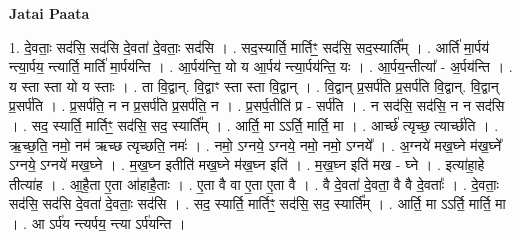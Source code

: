 \documentclass[17pt]{extarticle}
\begin{document}
\textbf{Jatai Paata} \newline

1. दे॒वताः॒ सद॑सि॒ सद॑सि दे॒वता॑ दे॒वताः॒ सद॑सि । . सद॒स्यार्ति॒ मार्तिꣳ॒॒ सद॑सि॒ सद॒स्यार्ति᳚म् । . आर्ति॑ मा॒र्पय॑ न्त्या॒र्पय॒ न्त्यार्ति॒ मार्ति॑ मा॒र्पय॑न्ति । . आ॒र्पय॑न्ति॒ यो य आ॒र्पय॑ न्त्या॒र्पय॑न्ति॒ यः । . आ॒र्पय॒न्तीत्या᳚ - अ॒र्पय॑न्ति । . य स्ता स्ता यो य स्ताः । . ता वि॒द्वान्. वि॒द्वाꣳ स्ता स्ता वि॒द्वान् । . वि॒द्वान् प्र॒सर्प॑ति प्र॒सर्प॑ति वि॒द्वान्. वि॒द्वान् प्र॒सर्प॑ति । . प्र॒सर्प॑ति॒ न न प्र॒सर्प॑ति प्र॒सर्प॑ति॒ न । . प्र॒सर्प॒तीति॑ प्र - सर्प॑ति । . न सद॑सि॒ सद॑सि॒ न न सद॑सि । . सद॒ स्यार्ति॒ मार्तिꣳ॒॒ सद॑सि॒ सद॒ स्यार्ति᳚म् । . आर्ति॒ मा ऽऽर्ति॒ मार्ति॒ मा । . आर्च्छ॑ त्यृच्छ॒ त्यार्च्छ॑ति । . ऋ॒च्छ॒ति॒ नमो॒ नम॑ ऋच्छ त्यृच्छति॒ नमः॑ । . नमो॒ ऽग्नये॒ ऽग्नये॒ नमो॒ नमो॒ ऽग्नये᳚ । . अ॒ग्नये॑ मख॒घ्ने म॑ख॒घ्ने᳚ ऽग्नये॒ ऽग्नये॑ मख॒घ्ने । . म॒ख॒घ्न इतीति॑ मख॒घ्ने म॑ख॒घ्न इति॑ । . म॒ख॒घ्न इति॑ मख - घ्ने । . इत्या॑हा॒हे तीत्या॑ह । . आ॒है॒ता ए॒ता आ॑हाहै॒ताः । . ए॒ता वै वा ए॒ता ए॒ता वै । . वै दे॒वता॑ दे॒वता॒ वै वै दे॒वताः᳚ । . दे॒वताः॒ सद॑सि॒ सद॑सि दे॒वता॑ दे॒वताः॒ सद॑सि । . सद॒ स्यार्ति॒ मार्तिꣳ॒॒ सद॑सि॒ सद॒ स्यार्ति᳚म् । . आर्ति॒ मा ऽऽर्ति॒ मार्ति॒ मा । . आ ऽर्प॑य न्त्यर्पय॒ न्त्या ऽर्प॑यन्ति । \newline
\end{document}
